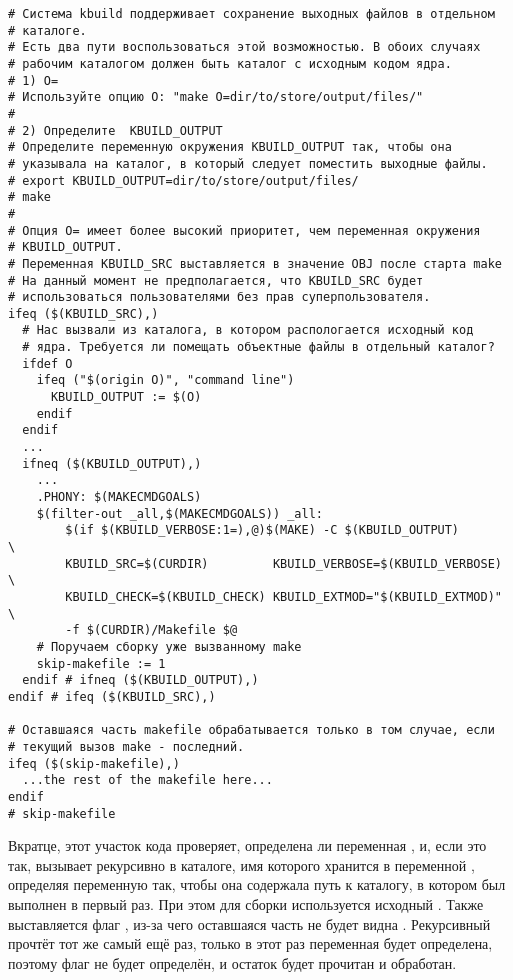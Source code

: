 \begin{verbatim}
# Система kbuild поддерживает сохранение выходных файлов в отдельном
# каталоге.
# Есть два пути воспользоваться этой возможностью. В обоих случаях
# рабочим каталогом должен быть каталог с исходным кодом ядра.
# 1) O=
# Используйте опцию O: "make O=dir/to/store/output/files/"
#
# 2) Определите  KBUILD_OUTPUT
# Определите переменную окружения KBUILD_OUTPUT так, чтобы она
# указывала на каталог, в который следует поместить выходные файлы.
# export KBUILD_OUTPUT=dir/to/store/output/files/
# make
#
# Опция O= имеет более высокий приоритет, чем переменная окружения
# KBUILD_OUTPUT.
# Переменная KBUILD_SRC выставляется в значение OBJ после старта make
# На данный момент не предполагается, что KBUILD_SRC будет
# использоваться пользователями без прав суперпользователя.
ifeq ($(KBUILD_SRC),)
  # Нас вызвали из каталога, в котором распологается исходный код
  # ядра. Требуется ли помещать объектные файлы в отдельный каталог?
  ifdef O
    ifeq ("$(origin O)", "command line")
      KBUILD_OUTPUT := $(O)
    endif
  endif
  ...
  ifneq ($(KBUILD_OUTPUT),)
    ...
    .PHONY: $(MAKECMDGOALS)
    $(filter-out _all,$(MAKECMDGOALS)) _all:
        $(if $(KBUILD_VERBOSE:1=),@)$(MAKE) -C $(KBUILD_OUTPUT)       \
        KBUILD_SRC=$(CURDIR)         KBUILD_VERBOSE=$(KBUILD_VERBOSE) \
        KBUILD_CHECK=$(KBUILD_CHECK) KBUILD_EXTMOD="$(KBUILD_EXTMOD)" \
        -f $(CURDIR)/Makefile $@
    # Поручаем сборку уже вызванному make
    skip-makefile := 1
  endif # ifneq ($(KBUILD_OUTPUT),)
endif # ifeq ($(KBUILD_SRC),)

# Оставшаяся часть makefile обрабатывается только в том случае, если
# текущий вызов make - последний.
ifeq ($(skip-makefile),)
  ...the rest of the makefile here...
endif
# skip-makefile
\end{verbatim}

Вкратце, этот участок кода проверяет, определена ли переменная
, и, если это так, вызывает \GNUmake{}
рекурсивно в каталоге, имя которого хранится в переменной
\variable{KBUILD\_OUTPUT}, определяя переменную 
так, чтобы она содержала путь к каталогу, в котором \GNUmake{} был
выполнен в первый раз. При этом для сборки используется исходный
\Makefile{}. Также выставляется флаг , из-за
чего оставшаяся часть  не будет видна
\GNUmake{}. Рекурсивный \GNUmake{} прочтёт тот же самый \Makefile{}
ещё раз, только в этот раз переменная \variable{KBUILD\_SRC} будет
определена, поэтому флаг \variable{skip-makefile} не будет определён,
и остаток \makefile{а} будет прочитан и обработан.

